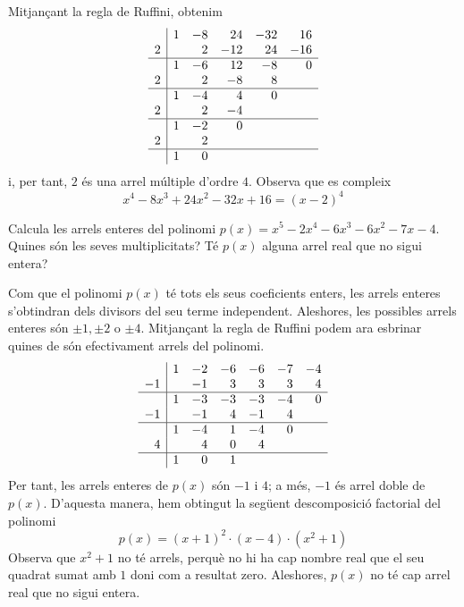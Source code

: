 \begin{solucio}
Mitjançant la regla de Ruffini, obtenim\[
\begin{array}{r|rrrrr}
& 1 & -8 & 24 & -32 & 16 \\
2 & & 2 & -12 & 24 & -16 \\\hline
& 1 & -6 & 12 & -8 & 0 \\
2 & & 2 & -8 & 8 & \\\hline
& 1 & -4 & 4 & 0 & \\
2 & & 2 & -4 & & \\\hline
& 1 & -2 & 0 & & \\
2 & & 2 & & & \\\hline
 & 1 & 0 & & &
\end{array}\]i, per tant, $2$ és una arrel múltiple d'ordre $4$. Observa que es
compleix\[
x^{4}-8x^{3}+24x^{2}-32x+16=(x-2)^{4}
\]
\end{solucio}

\begin{exercici}
Calcula les arrels enteres del polinomi $p(x)=x^{5}-2x^{4}-6x^{3}-6x^{2}-7x-4$. Quines són les seves
multiplicitats? Té $p(x)$ alguna arrel real que no
sigui entera?
\end{exercici}

\begin{solucio}
Com que el polinomi $p(x)$ té tots els seus coeficients enters, les arrels enteres s'obtindran dels divisors del seu terme
independent. Aleshores, les possibles arrels enteres són $\pm 1,\pm 2$ o $\pm 4$. Mitjançant la regla de Ruffini podem ara esbrinar quines de
són efectivament arrels del polinomi.\[
\begin{array}{r|rrrrrr}
& 1 & -2 & -6 & -6 & -7 & -4 \\
-1 & & -1 & 3 & 3 & 3 & 4 \\\hline
& 1 & -3 & -3 & -3 & -4 & 0 \\
-1 & & -1 & 4 & -1 & 4 & \\\hline
& 1 & -4 & 1 & -4 & 0 & \\
4 & & 4 & 0 & 4 & & \\\hline
 & 1 & 0 & 1 & & &
\end{array}\]Per tant, les arrels enteres de $p(x)$ són $-1$ i $4$; a més, $-1$
és arrel doble de $p(x)$. D'aquesta manera, hem obtingut la següent
descomposició factorial del polinomi\[
p(x)=(x+1)^{2}\cdot (x-4)\cdot (x^{2}+1)
\]Observa que $x^{2}+1$ no té arrels, perquè no hi ha cap nombre real que el seu quadrat sumat amb $1$ doni com a resultat zero. Aleshores, $p(x)$ no té cap arrel real que no sigui entera.
\end{solucio}

